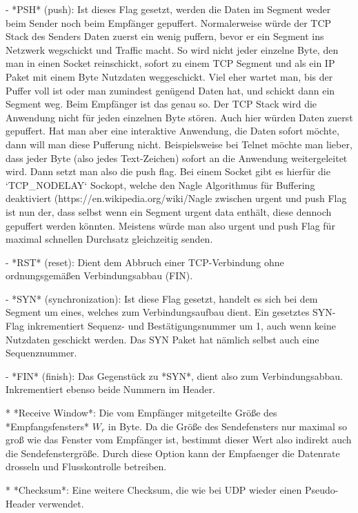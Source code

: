    - *PSH* (push): Ist dieses Flag gesetzt, werden die Daten im Segment weder
	 beim Sender noch beim Empfänger gepuffert. Normalerweise würde der TCP
	 Stack des Senders Daten zuerst ein wenig puffern, bevor er ein Segment ins
	 Netzwerk wegschickt und Traffic macht. So wird nicht jeder einzelne Byte,
	 den man in einen Socket reinschickt, sofort zu einem TCP Segment und als
	 ein IP Paket mit einem Byte Nutzdaten weggeschickt. Viel eher wartet man,
	 bis der Puffer voll ist oder man zumindest genügend Daten hat, und schickt
	 dann ein Segment weg. Beim Empfänger ist das genau so. Der TCP Stack wird
	 die Anwendung nicht für jeden einzelnen Byte stören. Auch hier würden Daten
	 zuerst gepuffert. Hat man aber eine interaktive Anwendung, die Daten sofort
	 möchte, dann will man diese Pufferung nicht. Beispielsweise bei Telnet
	 möchte man lieber, dass jeder Byte (also jedes Text-Zeichen) sofort an die
	 Anwendung weitergeleitet wird. Dann setzt man also die push flag. Bei einem
	 Socket gibt es hierfür die `TCP_NODELAY` Sockopt, welche den Nagle
	 Algorithmus für Buffering deaktiviert
	 (https://en.wikipedia.org/wiki/Nagle%
	 zwischen urgent und push Flag ist nun der, dass selbst wenn ein Segment
	 urgent data enthält, diese dennoch gepuffert werden könnten. Meistens würde
	 man also urgent und push Flag für maximal schnellen Durchsatz gleichzeitig
	 senden.

   - *RST* (reset): Dient dem Abbruch einer TCP-Verbindung ohne ordnungsgemäßen
	 Verbindungsabbau (FIN).

   - *SYN* (synchronization): Ist diese Flag gesetzt, handelt es sich bei dem
	 Segment um eines, welches zum Verbindungsaufbau dient. Ein gesetztes SYN-Flag
	 inkrementiert Sequenz- und Bestätigungsnummer um 1, auch wenn keine Nutzdaten
	 geschickt werden. Das SYN Paket hat nämlich selbst auch eine Sequenznummer.

   - *FIN* (finish): Das Gegenstück zu *SYN*, dient also zum
	 Verbindungsabbau. Inkrementiert ebenso beide Nummern im Header.

* *Receive Window*: Die vom Empfänger mitgeteilte Größe des *Empfangsfensters*
  $W_r$ in Byte. Da die Größe des Sendefensters nur maximal so groß wie das
  Fenster vom Empfänger ist, bestimmt dieser Wert also indirekt auch die
  Sendefenstergröße. Durch diese Option kann der Empfaenger die Datenrate
  drosseln und Flusskontrolle betreiben.

* *Checksum*: Eine weitere Checksum, die wie bei UDP wieder einen Pseudo-Header
  verwendet.

